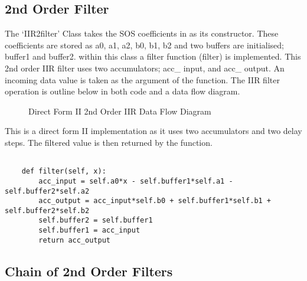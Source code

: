 \documentclass{article}
\begin{document}
\subsection{2nd Order Filter}
The `IIR2filter' Class takes the SOS coefficients in as its constructor. These coefficients are stored as a0, a1, a2, b0, b1, b2 and two buffers are initialised; buffer1 and buffer2. within this class a filter function (filter) is implemented. This 2nd order IIR filter uses two accumulators; acc\_ input, and acc\_ output. An incoming data value is taken as the argument of the function. The IIR filter operation is outline below in both code and a data flow diagram.
\newline
\begin{figure}[h!]
    \centering
    
    \caption{Direct Form II 2nd Order IIR Data Flow Diagram }
    \label{fig:universe}
\end{figure}
\newline 
This is a direct form II implementation as it uses two accumulators and two delay steps. The filtered value is then returned by the function. 
\newline
\newline
\begin{lstlisting}

    def filter(self, x): 
        acc_input = self.a0*x - self.buffer1*self.a1 - self.buffer2*self.a2 
        acc_output = acc_input*self.b0 + self.buffer1*self.b1 + self.buffer2*self.b2 
        self.buffer2 = self.buffer1
        self.buffer1 = acc_input
        return acc_output
\end{lstlisting}

\subsection{Chain of 2nd Order Filters}
\end{document}
